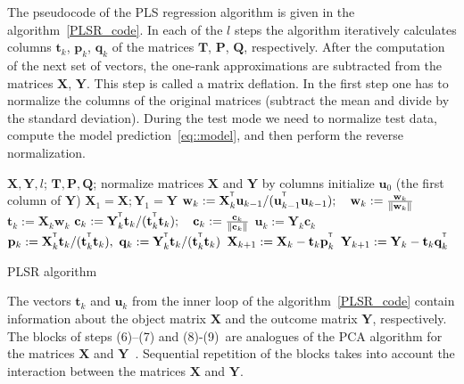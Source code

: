 \documentclass[preprint,12pt]{elsarticle}
\newcommand{\bw}{\mathbf{w}}
\newcommand{\bY}{\mathbf{Y}}
\newcommand{\bX}{\mathbf{X}}
\newcommand{\bu}{\mathbf{u}}
\newcommand{\bt}{\mathbf{t}}
\newcommand{\bp}{\mathbf{p}}
\newcommand{\bq}{\mathbf{q}}
\newcommand{\bc}{\mathbf{c}}
\newcommand{\bP}{\mathbf{P}}
\newcommand{\bT}{\mathbf{T}}
\newcommand{\bQ}{\mathbf{Q}}
\newcommand{\T}{^{\text{\tiny\sffamily\upshape\mdseries T}}}
\begin{document}
The pseudocode of the PLS regression algorithm is given in the algorithm~\ref{PLSR_code}.
In each of the $l$ steps the algorithm iteratively calculates columns $\bt_k$, $\bp_k$, $\bq_k$ of the matrices $\bT$, $\bP$, $\bQ$, respectively. 
After the computation of the next set of vectors, the one-rank approximations are subtracted from the matrices $\bX$, $\bY$. 
This step is called a matrix deflation.
In the first step one has to normalize the columns of the original matrices (subtract the mean and divide by the standard deviation).
During the test mode we need to normalize test data, compute the model prediction~\eqref{eq::model}, and then perform the reverse normalization.
\begin{algorithm}[h]
	\begin{algorithmic}[1]
		\REQUIRE $\bX, \bY, l$;
		\ENSURE $\bT, \bP, \bQ$;
		\STATE normalize matrices $\bX$ and $\bY$ by columns
		\STATE initialize $\bu_0$ (the first column of $\bY$)
		\STATE $\bX_1 = \bX; \bY_1 = \bY$
		\REPEAT
		\vspace{0.1cm}
		\STATE $\bw_k := \bX_k^{\T} \bu_{k-1} / (\bu_{k-1}^{\T} \bu_{k-1}); \quad \bw_k: = \frac{\bw_k}{\| \bw_k \|}$
		\vspace{0.1cm}
		\STATE $\bt_k := \bX_k \bw_k$
		\vspace{0.1cm}
		\STATE $\bc_k := \bY_k^{\T} \bt_k / (\bt_k^{\T} \bt_k); \quad \bc_k: = \frac{\bc_k}{\| \bc_k \|}$
		\vspace{0.1cm}
		\STATE $\bu_k := \bY_k \bc_k$
		\UNTIL{$\bt_k$ stabilizes}
		\vspace{0.1cm}
		\STATE $\bp_k:= \bX_k^{\T}\bt_k/(\bt_k^{\T}\bt_k),\ 
		\bq_k := \bY_k^{\T}\bt_k/(\bt_k^{\T}\bt_k)$
		\vspace{0.2cm}
		\STATE $\bX_{k+1} :=  \bX_k - \bt_k \bp_k^{\T}$
		\vspace{0.2cm}
		\STATE $\bY_{k + 1} :=  \bY_k - \bt_k \bq_k^{\T}$ 
		\ENDFOR
	\end{algorithmic}
\caption{PLSR algorithm}
\label{PLSR_code}
\end{algorithm}

The vectors $\bt_k$ and $\bu_k$ from the inner loop of the algorithm~\ref{PLSR_code} contain information about the object matrix $\bX$ and the outcome matrix $\bY$, respectively. 
The blocks of steps (6)--(7) and (8)-(9)~are analogues of the PCA algorithm for the matrices $\bX$ and $\bY$~\cite{geladi1986partial}. 
Sequential repetition of the blocks takes into account the interaction between the matrices $\bX$ and $\bY$.
\end{document}
